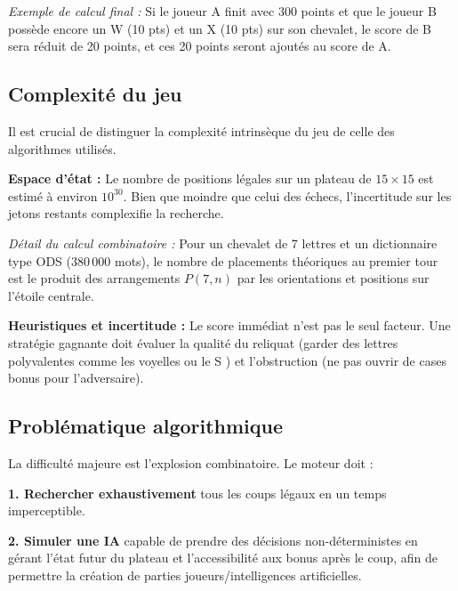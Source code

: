 \documentclass[a4paper]{article}
\begin{document}
\hangindent=1.5cm
\textit{Exemple de calcul final :} Si le joueur A finit avec 300 points et que le joueur B possède encore un \og W \fg{} (10 pts) et un \og X \fg{} (10 pts) sur son chevalet, le score de B sera réduit de 20 points, et ces 20 points seront ajoutés au score de A.

\subsection{Complexité du jeu}
\hangindent=0.8mm
Il est crucial de distinguer la complexité intrinsèque du jeu de celle des algorithmes utilisés.

\hangindent=0.8mm
\textbf{Espace d'état :} Le nombre de positions légales sur un plateau de $15 \times 15$ est estimé à environ $10^{30}$. Bien que moindre que celui des échecs, l'incertitude sur les jetons restants complexifie la recherche.

\hangindent=1.5cm
\textit{Détail du calcul combinatoire :} Pour un chevalet de 7 lettres et un dictionnaire type ODS (380\,000 mots), le nombre de placements théoriques au premier tour est le produit des arrangements $P(7, n)$ par les orientations et positions sur l'étoile centrale.

\vspace{1\baselineskip}
\hangindent=0.8mm
\textbf{Heuristiques et incertitude :} Le score immédiat n'est pas le seul facteur. Une stratégie gagnante doit évaluer la \og qualité du reliquat \fg{} (garder des lettres polyvalentes comme les voyelles ou le \og S \fg{}) et l'obstruction (ne pas ouvrir de cases bonus pour l'adversaire).

\subsection{Problématique algorithmique}
\hangindent=0.8mm
La difficulté majeure est l'explosion combinatoire. Le moteur doit :

\hangindent=1.5cm
\textbf{1. Rechercher exhaustivement} tous les coups légaux en un temps imperceptible.

\vspace{1\baselineskip}
\hangindent=1.5cm
\textbf{2. Simuler une IA} capable de prendre des décisions non-déterministes en gérant l'état futur du plateau et l'accessibilité aux bonus après le coup, afin de permettre la création de parties joueurs/intelligences artificielles.
\end{document}
